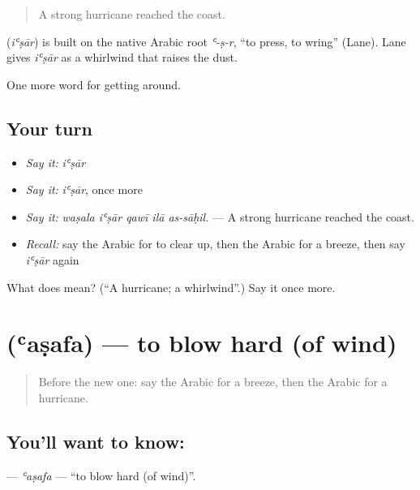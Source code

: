 \begin{quote}
A strong hurricane reached the coast.
\end{quote}

\begin{cousinweb}
\textbf{} (\emph{iʿṣār}) is built on the native Arabic root \emph{ʿ-ṣ-r}, \textquotedblleft{}to press, to wring\textquotedblright{} (Lane). Lane gives \emph{iʿṣār} as a whirlwind that raises the dust.
\end{cousinweb}

\begin{grammarlens}[title={What you've built}]
One more word for getting around.
\end{grammarlens}

\subsection*{Your turn}
\begin{itemize}
\raggedright
  \item \emph{Say it:} \emph{iʿṣār}
  \item \emph{Say it:} \emph{iʿṣār}, once more
  \item \emph{Say it:} \emph{waṣala iʿṣār qawī ilā as-sāḥil.} — A strong hurricane reached the coast.
  \item \emph{Recall:} say the Arabic for to clear up, then the Arabic for a breeze, then say \emph{iʿṣār} again
\end{itemize}

\begin{tcolorbox}[breakable,colback=teal!4,colframe=teal!35!black,title={Before you move on}]
What does  mean? (\textquotedblleft{}A hurricane; a whirlwind\textquotedblright{}.) Say it once more.
\end{tcolorbox}
\section[\texorpdfstring{\ar{عصف} (ʿaṣafa)}{عصف (ʿaṣafa)}]{ (ʿaṣafa) — to blow hard (of wind)}

\label{lesson:AR-C482-asafa}



\begin{quote}
Before the new one: say the Arabic for a breeze, then the Arabic for a hurricane.
\end{quote}

\subsection*{You'll want to know: }
\textbf{} — \emph{ʿaṣafa} — \textquotedblleft{}to blow hard (of wind)\textquotedblright{}.

